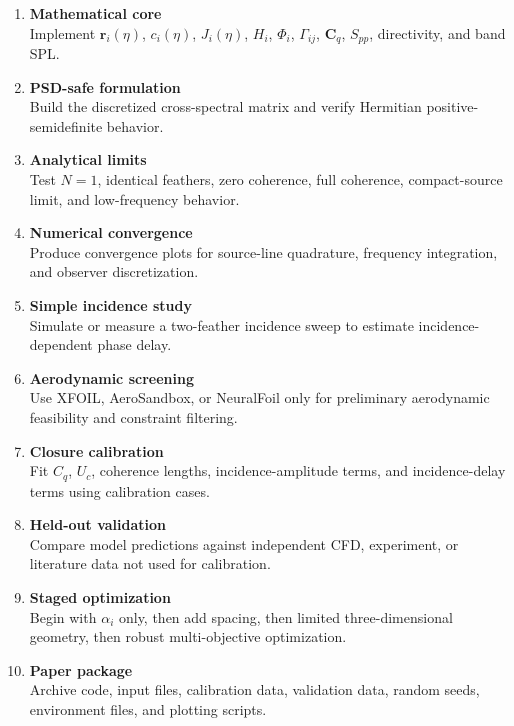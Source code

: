 \documentclass[11pt]{article}
\newcommand{\vect}[1]{\bm{#1}}
\newcommand{\mat}[1]{\bm{#1}}
\begin{document}
\begin{enumerate}
    \item \textbf{Mathematical core}\\
    Implement $\vect{r}_i(\eta)$, $c_i(\eta)$, $J_i(\eta)$, $H_i$, $\Phi_i$, $\Gamma_{ij}$, $\mat{C}_q$, $S_{pp}$, directivity, and band SPL.

    \item \textbf{PSD-safe formulation}\\
    Build the discretized cross-spectral matrix and verify Hermitian positive-semidefinite behavior.

    \item \textbf{Analytical limits}\\
    Test $N=1$, identical feathers, zero coherence, full coherence, compact-source limit, and low-frequency behavior.

    \item \textbf{Numerical convergence}\\
    Produce convergence plots for source-line quadrature, frequency integration, and observer discretization.

    \item \textbf{Simple incidence study}\\
    Simulate or measure a two-feather incidence sweep to estimate incidence-dependent phase delay.

    \item \textbf{Aerodynamic screening}\\
    Use XFOIL, AeroSandbox, or NeuralFoil only for preliminary aerodynamic feasibility and constraint filtering.

    \item \textbf{Closure calibration}\\
    Fit $C_q$, $U_c$, coherence lengths, incidence-amplitude terms, and incidence-delay terms using calibration cases.

    \item \textbf{Held-out validation}\\
    Compare model predictions against independent CFD, experiment, or literature data not used for calibration.

    \item \textbf{Staged optimization}\\
    Begin with $\alpha_i$ only, then add spacing, then limited three-dimensional geometry, then robust multi-objective optimization.

    \item \textbf{Paper package}\\
    Archive code, input files, calibration data, validation data, random seeds, environment files, and plotting scripts.
\end{enumerate}
\end{document}
